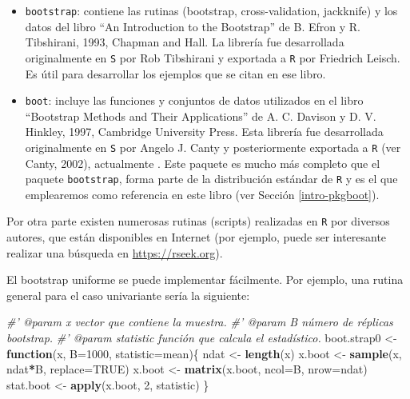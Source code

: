 \documentclass[]{book}
\newenvironment{Shaded}{\begin{snugshade}}{\end{snugshade}}
\newcommand{\KeywordTok}[1]{\textcolor[rgb]{0.13,0.29,0.53}{\textbf{#1}}}
\newcommand{\DataTypeTok}[1]{\textcolor[rgb]{0.13,0.29,0.53}{#1}}
\newcommand{\DecValTok}[1]{\textcolor[rgb]{0.00,0.00,0.81}{#1}}
\newcommand{\StringTok}[1]{\textcolor[rgb]{0.31,0.60,0.02}{#1}}
\newcommand{\CommentTok}[1]{\textcolor[rgb]{0.56,0.35,0.01}{\textit{#1}}}
\newcommand{\OtherTok}[1]{\textcolor[rgb]{0.56,0.35,0.01}{#1}}
\newcommand{\ControlFlowTok}[1]{\textcolor[rgb]{0.13,0.29,0.53}{\textbf{#1}}}
\newcommand{\OperatorTok}[1]{\textcolor[rgb]{0.81,0.36,0.00}{\textbf{#1}}}
\newcommand{\NormalTok}[1]{#1}
\theoremstyle{break}
\theoremstyle{definition}
\theoremstyle{definition}
\theoremstyle{definition}
\theoremstyle{remark}
\begin{document}
\begin{itemize}
\item
  \texttt{bootstrap}: contiene las rutinas (bootstrap, cross-validation,
  jackknife) y los datos del libro ``An Introduction to the Bootstrap''
  de B. Efron y R. Tibshirani, 1993, Chapman and Hall. La librería fue
  desarrollada originalmente en \texttt{S} por Rob Tibshirani y
  exportada a \texttt{R} por Friedrich Leisch. Es útil para desarrollar
  los ejemplos que se citan en ese libro.
\item
  \texttt{boot}: incluye las funciones y conjuntos de datos utilizados
  en el libro ``Bootstrap Methods and Their Applications'' de A. C.
  Davison y D. V. Hinkley, 1997, Cambridge University Press. Esta
  librería fue desarrollada originalmente en \texttt{S} por Angelo J.
  Canty y posteriormente exportada a \texttt{R} (ver Canty, 2002),
  actualmente . Este paquete es mucho más completo que el paquete
  \texttt{bootstrap}, forma parte de la distribución estándar de
  \texttt{R} y es el que emplearemos como referencia en este libro (ver
  Sección \ref{intro-pkgboot}).
\end{itemize}

Por otra parte existen numerosas rutinas (scripts) realizadas en
\texttt{R} por diversos autores, que están disponibles en Internet (por
ejemplo, puede ser interesante realizar una búsqueda en
\url{https://rseek.org}).

El bootstrap uniforme se puede implementar fácilmente. Por ejemplo, una
rutina general para el caso univariante sería la siguiente:

\begin{Shaded}
\begin{Highlighting}[]
\CommentTok{#' @param x vector que contiene la muestra.}
\CommentTok{#' @param B número de réplicas bootstrap.}
\CommentTok{#' @param statistic función que calcula el estadístico.}
\NormalTok{boot.strap0 <-}\StringTok{ }\ControlFlowTok{function}\NormalTok{(x, }\DataTypeTok{B=}\DecValTok{1000}\NormalTok{, }\DataTypeTok{statistic=}\NormalTok{mean)\{}
\NormalTok{  ndat <-}\StringTok{ }\KeywordTok{length}\NormalTok{(x)}
\NormalTok{  x.boot <-}\StringTok{ }\KeywordTok{sample}\NormalTok{(x, ndat}\OperatorTok{*}\NormalTok{B, }\DataTypeTok{replace=}\OtherTok{TRUE}\NormalTok{)}
\NormalTok{  x.boot <-}\StringTok{ }\KeywordTok{matrix}\NormalTok{(x.boot, }\DataTypeTok{ncol=}\NormalTok{B, }\DataTypeTok{nrow=}\NormalTok{ndat)}
\NormalTok{  stat.boot <-}\StringTok{ }\KeywordTok{apply}\NormalTok{(x.boot, }\DecValTok{2}\NormalTok{, statistic)}
\NormalTok{\}}
\end{Highlighting}
\end{Shaded}
\end{document}
